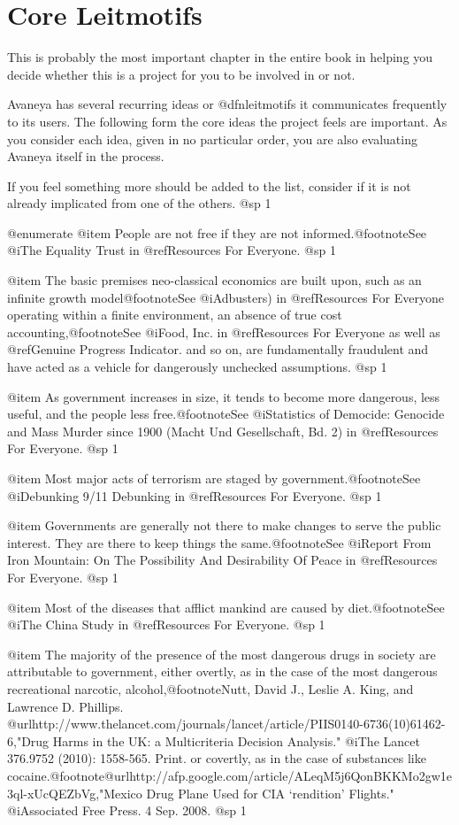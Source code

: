 \chapter{Core Leitmotifs}

This is probably the most important chapter in the entire book in helping you decide whether this is a project for you to be involved in or not. 

Avaneya has several recurring ideas or @dfn{leitmotifs} it communicates frequently to its users. The following form the core ideas the project feels are important. As you consider each idea, given in no particular order, you are also evaluating Avaneya itself in the process. 

If you feel something more should be added to the list, consider if it is not already implicated from one of the others.
@sp 1

@enumerate
@item
People are not free if they are not informed.@footnote{See @i{The Equality Trust} in @ref{Resources For Everyone}.}
@sp 1

@item
The basic premises neo-classical economics are built upon, such as an infinite growth model@footnote{See @i{Adbusters)} in @ref{Resources For Everyone}} operating within a finite environment, an absence of true cost accounting,@footnote{See @i{Food, Inc.} in @ref{Resources For Everyone} as well as @ref{Genuine Progress Indicator}.} and so on, are fundamentally fraudulent and have acted as a vehicle for dangerously unchecked assumptions.
@sp 1

@item
As government increases in size, it tends to become more dangerous, less useful, and the people less free.@footnote{See @i{Statistics of Democide: Genocide and Mass Murder since 1900 (Macht Und Gesellschaft, Bd. 2)} in @ref{Resources For Everyone}.}
@sp 1

@item
Most major acts of terrorism are staged by government.@footnote{See @i{Debunking 9/11 Debunking} in @ref{Resources For Everyone}.}
@sp 1

@item
Governments are generally not there to make changes to serve the public interest. They are there to keep things the same.@footnote{See @i{Report From Iron Mountain: On The Possibility And Desirability Of Peace} in @ref{Resources For Everyone}.}
@sp 1

@item
Most of the diseases that afflict mankind are caused by diet.@footnote{See @i{The China Study} in @ref{Resources For Everyone}.}
@sp 1

@item
The majority of the presence of the most dangerous drugs in society are attributable to government, either overtly, as in the case of the most dangerous recreational narcotic, alcohol,@footnote{Nutt, David J., Leslie A. King, and Lawrence D. Phillips. @url{http://www.thelancet.com/journals/lancet/article/PIIS0140-6736(10)61462-6,"Drug Harms in the UK: a Multicriteria Decision Analysis."} @i{The Lancet} 376.9752 (2010): 1558-565. Print.} or covertly, as in the case of substances like cocaine.@footnote{@url{http://afp.google.com/article/ALeqM5j6QonBKKMo2gw1e3ql-xUcQEZbVg,"Mexico Drug Plane Used for CIA ‘rendition’ Flights."} @i{Associated Free Press}. 4 Sep. 2008.}
@sp 1

